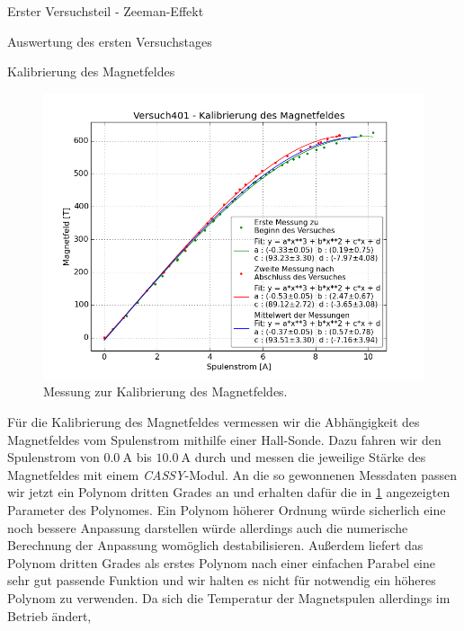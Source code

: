 \documentclass[pdftex, a4paper,11pt, twoside, ngerman]{report}
\begin{document}
\begin{chapter}{Erster Versuchsteil - Zeeman-Effekt}
\begin{section}{Auswertung des ersten Versuchstages}
      \begin{subsection}{Kalibrierung des Magnetfeldes}
        \label{chp:Zeeman:sec:AuswertungMagnetfeld}
        \begin{figure}[b!]
          \centering
          \includegraphics[width=\textwidth]
              {Figures/Versuch401-KalibrierungdesMagnetfeldes.png}
          \caption{Messung zur Kalibrierung des Magnetfeldes.}
          \label{fig:MagnetfeldKalibrierung}
        \end{figure}
        Für die Kalibrierung des Magnetfeldes vermessen wir die Abhängigkeit
        des Magnetfeldes vom Spulenstrom mithilfe einer Hall-Sonde. Dazu fahren
        wir den Spulenstrom von $\SI{0.0}{\ampere}$ bis $\SI{10.0}{\ampere}$
        durch und messen die jeweilige Stärke des Magnetfeldes mit einem
        \textit{CASSY}-Modul. An die so gewonnenen Messdaten passen wir jetzt
        ein Polynom dritten Grades an und erhalten dafür die in
        \cref{fig:MagnetfeldKalibrierung} angezeigten Parameter des Polynomes.
        Ein Polynom höherer Ordnung würde sicherlich eine noch bessere
        Anpassung darstellen würde allerdings auch die numerische Berechnung der
        Anpassung womöglich destabilisieren. Außerdem liefert das Polynom
        dritten Grades als erstes Polynom nach einer einfachen Parabel eine sehr
        gut passende Funktion und wir halten es nicht für notwendig ein höheres
        Polynom zu verwenden.
        Da sich die Temperatur der Magnetspulen allerdings im Betrieb ändert,

\end{subsection}
\end{section}
\end{chapter}
\end{document}
